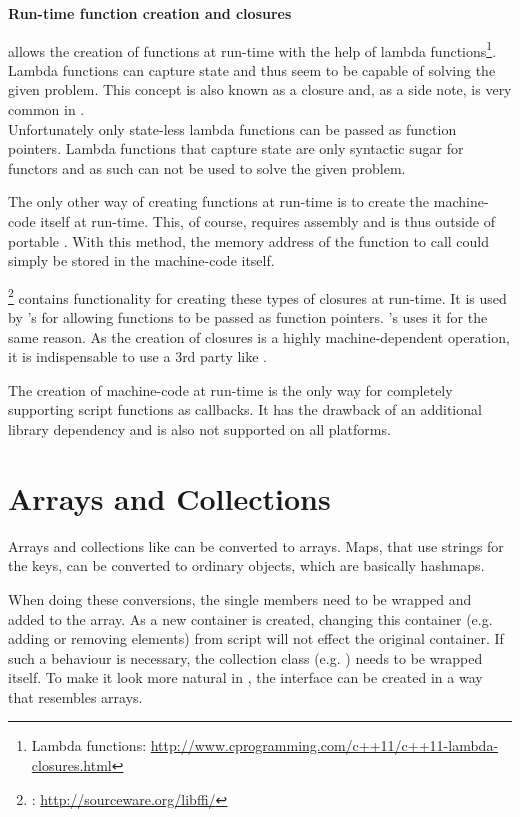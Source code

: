 \textbf{Run-time function creation and closures}

 allows the creation of functions at run-time with the help of lambda functions\footnote{Lambda functions: \url{http://www.cprogramming.com/c++11/c++11-lambda-closures.html}}. Lambda functions can capture state and thus seem to be capable of solving the given problem. This concept is also known as a closure and, as a side note, is very common in .
\\Unfortunately only state-less lambda functions can be passed as function pointers. Lambda functions that capture state are only syntactic sugar for functors and as such can not be used to solve the given problem.

The only other way of creating functions at run-time is to create the machine-code itself at run-time. This, of course, requires assembly and is thus outside of portable . With this method, the memory address of the  function to call could simply be stored in the machine-code itself.

\footnote{: \url{http://sourceware.org/libffi/}} contains functionality for creating these types of closures at run-time. It is used by 's  for allowing  functions to be passed as  function pointers. 's  uses it for the same reason. As the creation of closures is a highly machine-dependent operation, it is indispensable to use a 3rd party like .

The creation of machine-code at run-time is the only way for completely supporting script functions as callbacks. It has the drawback of an additional library dependency and is also not supported on all platforms.

\section{Arrays and Collections}

Arrays and collections like  can be converted to  arrays. Maps, that use strings for the keys, can be converted to ordinary  objects, which are basically hashmaps.

When doing these conversions, the single members need to be wrapped and added to the  array. As a new  container is created, changing this container (e.g. adding or removing elements) from script will not effect the original  container. If such a behaviour is necessary, the collection class (e.g. ) needs to be wrapped itself. To make it look more natural in , the interface can be created in a way that resembles  arrays.

